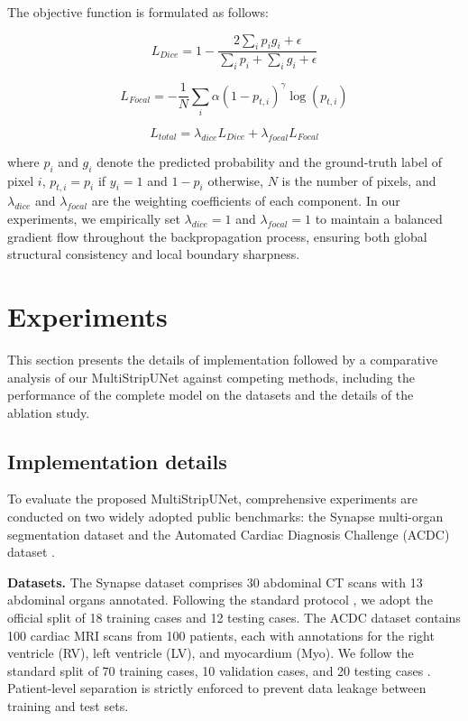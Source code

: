 \documentclass{llncs}
\begin{document}
The objective function is formulated as follows:

\begin{equation}\label{eq:dice}
  L_{Dice} = 1 - \frac{2\sum_{i} p_i g_i + \epsilon}{\sum_{i} p_i + \sum_{i} g_i + \epsilon}
\end{equation}

\begin{equation}\label{eq:focal}
  L_{Focal} = -\frac{1}{N}\sum_{i} \alpha (1 - p_{t,i})^{\gamma} \log(p_{t,i})
\end{equation}

\begin{equation}\label{eq:total}
  L_{total} = \lambda_{dice} L_{Dice} + \lambda_{focal} L_{Focal}
\end{equation}

where $p_i$ and $g_i$ denote the predicted probability and the ground-truth label of pixel $i$, $p_{t,i} = p_i$ if $y_i = 1$ and $1 - p_i$ otherwise, $N$ is the number of pixels, and $\lambda_{dice}$ and $\lambda_{focal}$ are the weighting coefficients of each component. In our experiments, we empirically set $\lambda_{dice} = 1$ and $\lambda_{focal} = 1$ to maintain a balanced gradient flow throughout the backpropagation process, ensuring both global structural consistency and local boundary sharpness.

\section{Experiments}

This section presents the details of implementation followed by a comparative analysis of our MultiStripUNet against competing methods, including the performance of the complete model on the datasets and the details of the ablation study.

\subsection{Implementation details}\label{sec:impl}

To evaluate the proposed MultiStripUNet, comprehensive experiments are conducted on two widely adopted public benchmarks: the Synapse multi-organ segmentation dataset \cite{landman2015miccai} and the Automated Cardiac Diagnosis Challenge (ACDC) dataset \cite{bernard2018deep}.

\textbf{Datasets.} The Synapse dataset comprises 30 abdominal CT scans with 13 abdominal organs annotated. Following the standard protocol \cite{cao2021swinunet,chen2021transunet}, we adopt the official split of 18 training cases and 12 testing cases. The ACDC dataset contains 100 cardiac MRI scans from 100 patients, each with annotations for the right ventricle (RV), left ventricle (LV), and myocardium (Myo). We follow the standard split of 70 training cases, 10 validation cases, and 20 testing cases \cite{bernard2018deep}. Patient-level separation is strictly enforced to prevent data leakage between training and test sets.
\end{document}
